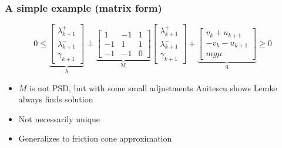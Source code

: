 \documentclass{beamer}
\begin{document}
\begin{frame}
    \frametitle{A simple example (matrix form)}
\[
    0 \leq 
    \underbrace{
    \begin{bmatrix}
        \lambda^+_{k+1} \\
        \lambda^-_{k+1} \\
        \gamma_{k+1}
    \end{bmatrix}
    }_\lambda
    \perp
    \underbrace{
    \begin{bmatrix}
        1 & -1 & 1 \\
        -1 & 1 & 1 \\
        -1 & -1 & 0
    \end{bmatrix}
    }_\text{M}
    \begin{bmatrix}
        \lambda^+_{k+1} \\
        \lambda^-_{k+1} \\
        \gamma_{k+1}
    \end{bmatrix}
    +
    \underbrace{
    \begin{bmatrix}
        v_k + u_{k+1} \\
        -v_k - u_{k+1} \\
        m g \mu
    \end{bmatrix}
    }_\text{q}
    \geq 0
\]
\begin{itemize} 
    \item $M$ is not PSD, but with some small adjustments Anitescu shows Lemke always finds solution
    \item Not necessarily unique
    \item Generalizes to friction cone approximation
\end{itemize}
\end{frame}
\end{document}
